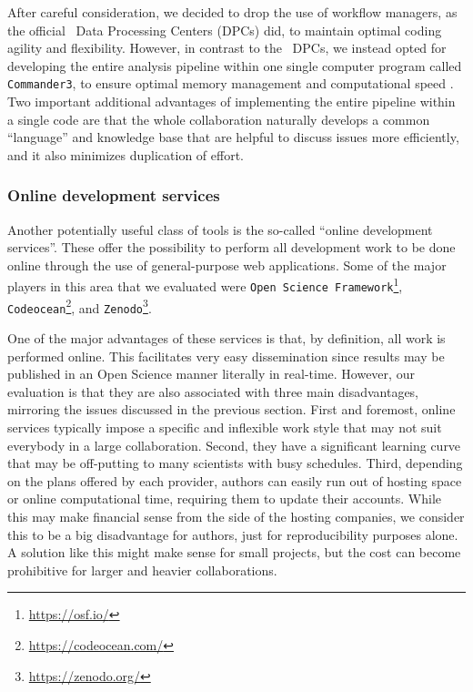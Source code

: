 \documentclass[twocolumn]{aa}
\def\commanderthree{\texttt{Commander3}}
\begin{document}
After careful consideration, we decided to drop the use of workflow managers, as the official \Planck\ Data Processing Centers (DPCs) did, to maintain optimal coding agility and flexibility. However, in contrast to the \Planck\ DPCs, we instead opted for developing the entire analysis pipeline within one single computer program called \commanderthree, to ensure optimal memory management and computational speed \citep{BP03}. Two important additional advantages of implementing the entire pipeline within a single code are that the whole collaboration naturally develops a common ``language'' and knowledge base that are helpful to discuss issues more efficiently, and it also minimizes duplication of effort.


\subsubsection{Online development services}

Another potentially useful class of tools is the so-called ``online development services''. These offer the possibility to perform all development work to be done online through the use of general-purpose web applications. Some of the major players in this area that we evaluated were \texttt{Open Science Framework}\footnote{\url{https://osf.io/}}, \texttt{Codeocean}\footnote{\url{https://codeocean.com/}}, and \texttt{Zenodo}\footnote{\url{https://zenodo.org/}}.

One of the major advantages of these services is that, by definition, all work is performed online. This facilitates very easy dissemination since results may be published in an Open Science manner literally in real-time. However, our evaluation is that they are also associated with three main disadvantages, mirroring the issues discussed in the previous section. First and foremost, online services typically impose a specific and inflexible work style that may not suit everybody in a large collaboration. Second, they have a significant learning curve that may be off-putting to many scientists with busy schedules. Third, depending on the plans offered by each provider, authors can easily run out of hosting space or online computational time, requiring them to update their accounts. While this may make financial sense from the side of the hosting companies, we consider this to be a big disadvantage for authors, just for reproducibility purposes alone. A solution like this might make sense for small projects, but the cost can become prohibitive for larger and heavier collaborations.
\end{document}
